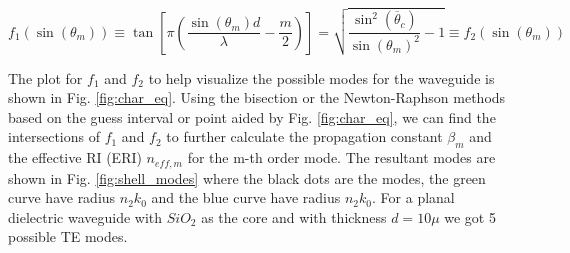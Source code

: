 \documentclass[a4paper,12pt]{article}
\begin{document}
\begin{equation}
    f_1(\sin(\theta_m)) \equiv \tan\left[ \pi \left(\frac{\sin(\theta_m) d}{\lambda} - \frac{m}{2}\right) \right] =
    \sqrt{\frac{\sin^2(\overline{\theta}_c)}{\sin(\theta_m)^2} - 1}
    \label{eq:char_eq} \equiv f_2(\sin(\theta_m))
\end{equation}

The plot for $f_1$ and $f_2$ to help visualize the possible modes for the waveguide is shown in Fig. \ref{fig:char_eq}. Using the bisection or the Newton-Raphson methods based on the guess interval or point aided by Fig. \ref{fig:char_eq}, we can find the intersections of $f_1$ and $f_2$ to further calculate the propagation constant $\beta_m$ and the effective RI (ERI) $n_{eff,m}$ for the m-th order mode. The resultant modes are shown in Fig. \ref{fig:shell_modes} where the black dots are the modes, the green curve have radius $n_2 k_0$ and the blue curve have radius $n_2 k_0$. For a planal dielectric waveguide with $SiO_2$ as the core and with thickness $d = 10\mu$ we got 5 possible TE modes.
\end{document}
